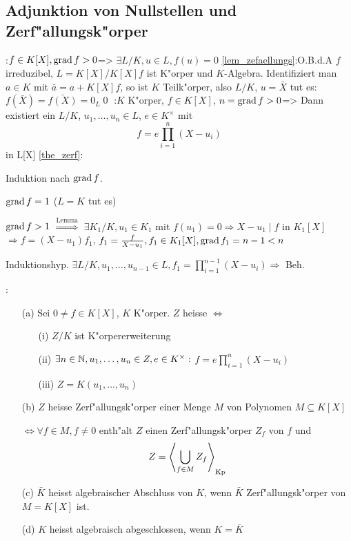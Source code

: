 \subsection{Adjunktion von Nullstellen und Zerf"allungsk"orper}
\lemma :{$f\in K[X], \operatorname{grad} f>0$}=>{
 \label{lem_zefaellungs}
 $\exists L/K, u\in L, f(u)=0$}
\proof \ref{lem_zefaellungs}:{O.B.d.A $f$ irreduzibel, $L=K[X]/K[X]f$ ist 
 K"orper und $K$-Algebra. Identifiziert man $a\in K$ mit $\bar{a}=a+K[X]f$,
 so ist $K$ Teilk"orper, also $L/K$, 
 $u=\bar{X}$ tut es: $f(\bar{X})=\bar{f(X)}=0_L$\qed
 }
:{$K$ K"orper, $f\in K[X]$, $n=\operatorname{grad} f>0$}=>{
\label{the_zerf} 
 Dann existiert ein $L/K$, $u_1,\ldots,u_n\in L$, $e\in K^{\times}$ mit
 \[f=e\prod_{i=1}^{n}(X-u_i)\] in L[X]} 
\proof \ref{the_zerf}:{Induktion nach $\operatorname{grad} f$.
 
 $\operatorname{grad} f=1$ ($L=K$ tut es)
 
 $\operatorname{grad} f>1$ $\stackrel{\text{Lemma}}{\Rightarrow}$
 $\exists K_1/K, u_1\in K_1$ mit $f(u_1)=0 \Rightarrow X-u_1 \mid f$ in $K_1[X]$
 $\Rightarrow f=(X-u_1)f_1$, $f_1=\frac{f}{X-u_1}, f_1\in K_1[X], 
 \operatorname{grad} f_1=n-1<n $
 
 Induktionshyp. $\exists L/K, u_1,\ldots, u_{n-1}\in L, f_1=\prod_{i=1}^{n-1}(X-u_i)
 \Rightarrow$ Beh. } 
:{
\begin{enumerate}
  \item[(a)] Sei $0\neq f\in K[X]$, $K$ K"orper. $Z$ heisse  $\iff$
  \begin{enumerate}
    \item[(i)] $Z/K$ ist K"orpererweiterung
	\item[(ii)] $\exists n\in \mathbb N, u_1,\ldots ,u_n\in Z, e\in K^{\times}:$ $f=e\prod_{i=1}^{n}(X-u_i)$
	\item[(iii)] $Z=K(u_1, \ldots, u_n)$ 
  \end{enumerate}
  \item[(b)] $Z$ heisse Zerf"allungsk"orper einer Menge $M$ von Polynomen $M\subseteq K[X]$
  
  $\iff \forall f\in M, f\neq 0$ enth"alt $Z$ einen Zerf"allungsk"orper $Z_f$ von $f$ und
  \[Z={\left\langle\bigcup_{f\in M}Z_f\right\rangle}_{\text{Kp}}\]
  \item[(c)] $\bar{K}$ heisst algebraischer Abschluss von $K$, wenn $\bar{K}$ Zerf"allungsk"orper
  von $M=K[X]$ ist.
  \item[(d)] $K$ heisst algebraisch abgeschlossen, wenn $K=\bar{K}$ 
\end{enumerate}}   
